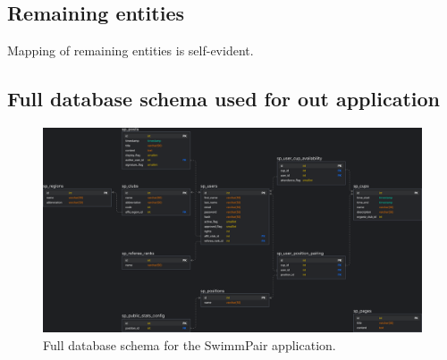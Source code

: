 \subsection*{Remaining entities}
Mapping of remaining entities is self-evident. 
\newpage
\subsection*{Full database schema used for out application}
\begin{figure}[h]	
	\centering	
    \includegraphics[scale=0.2175]{img/swimmpair_db_schema.png}
	\caption{Full database schema for the SwimmPair application.}
	\label{fig2.8:dbschemafull}
\end{figure}

